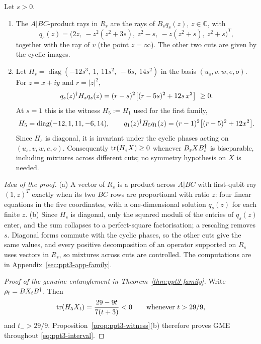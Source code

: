 \begin{proposition}\label{prop:ppt3-witness}
Let $s>0$.
\begin{enumerate}
\item[(a)] The $A|BC$-product rays in $R_s$ are the rays of $B_sq_s(z)$, $z\in\mathbb C$, with
\begin{equation}\label{eq:ppt3-curve}
q_s(z)=\bigl(2z,\ -z^2(z^2+3s),\ z^2-s,\ -z(z^2+s),\ z^2+s\bigr)^T,
\end{equation}
together with the ray of $v$ (the point $z=\infty$). The other two cuts are given by the cyclic images.
\item[(b)] Let $H_s=\operatorname{diag}(-12s^3,\ 1,\ 11s^2,\ -6s,\ 14s^2)$ in the basis $(u_s,v,w,e,o)$. For
$z=x+iy$ and $r=|z|^2$,
\begin{equation}\label{eq:ppt3-sos}
q_s(z)^{\dagger} H_sq_s(z)=(r-s)^2\bigl[(r-5s)^2+12s\,x^2\bigr]\ \ge0 .
\end{equation}
At $s=1$ this is the witness $H_5:=H_1$ used for the first family,
\begin{equation}\label{eq:ppt3-h5}
H_5=\operatorname{diag}(-12,1,11,-6,14),
\qquad
q_1(z)^{\dagger} H_5q_1(z)=(r-1)^2\bigl[(r-5)^2+12x^2\bigr].
\end{equation}
Since $H_s$ is diagonal, it is invariant under the cyclic phases acting on $(u_s,v,w,e,o)$. Consequently
$\operatorname{tr}(H_sX)\ge0$ whenever $B_sXB_s^{\dagger}$ is biseparable, including mixtures across different cuts;
no symmetry hypothesis on $X$ is needed.
\end{enumerate}
\end{proposition}

\emph{Idea of the proof.} (a) A vector of $R_s$ is a product across $A|BC$ with first-qubit ray $(1,z)^T$ exactly when
its two $BC$ rows are proportional with ratio $z$: four linear equations in the five coordinates, with a one-dimensional
solution $q_s(z)$ for each finite $z$. (b) Since $H_s$ is diagonal, only the squared moduli of the entries of $q_s(z)$
enter, and the sum collapses to a perfect-square factorisation; a rescaling removes $s$. Diagonal forms commute with the
cyclic phases, so the other cuts give the same values, and every positive decomposition of an operator supported on $R_s$
uses vectors in $R_s$, so mixtures across cuts are controlled. The computations are in Appendix~\ref{sec:ppt3-app-family}.

\begin{proof}[Proof of the genuine entanglement in Theorem~\ref{thm:ppt3-family}]
Write $\rho_t=BX_tB^{\dagger}$. Then
\begin{equation}\label{eq:ppt3-h5-value}
\operatorname{tr}(H_5X_t)=\frac{29-9t}{7(t+3)}<0\qquad\text{whenever }t>29/9,
\end{equation}
and $t_->29/9$. Proposition~\ref{prop:ppt3-witness}(b) therefore proves GME throughout \eqref{eq:ppt3-interval}.
\end{proof}

